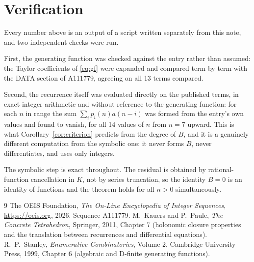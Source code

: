 \documentclass[11pt,a4paper]{article}
\theoremstyle{plain}
\theoremstyle{definition}
\begin{document}
\section{Verification}

Every number above is an output of a script written separately from this note, and two
independent checks were run.

First, the generating function was checked against the entry rather than assumed: the
Taylor coefficients of \eqref{eq:gf} were expanded and compared term by term with the DATA
section of A111779, agreeing on all 13 terms compared.

Second, the recurrence itself was evaluated directly on the published terms, in exact
integer arithmetic and without reference to the generating function: for each $n$ in range
the sum $\sum_{i}p_{i}(n)a(n-i)$ was formed from the entry's own values and found to
vanish, for all 14 values of $n$ from $n=7$ upward. This is what
Corollary~\ref{cor:criterion} predicts from the degree of $B$, and it is a genuinely
different computation from the symbolic one: it never forms $B$, never differentiates, and
uses only integers.

The symbolic step is exact throughout. The residual is obtained by rational-function
cancellation in $K$, not by series truncation, so the identity $B=0$ is an
identity of functions and the theorem holds for all $n>0$ simultaneously.

\begin{thebibliography}{9}
 The OEIS Foundation, \emph{The On-Line Encyclopedia of Integer Sequences},
\url{https://oeis.org}, 2026. Sequence A111779.
 M.~Kauers and P.~Paule, \emph{The Concrete Tetrahedron}, Springer, 2011,
Chapter 7 (holonomic closure properties and the translation between recurrences and
differential equations).
 R.~P.~Stanley, \emph{Enumerative Combinatorics}, Volume 2, Cambridge
University Press, 1999, Chapter 6 (algebraic and D-finite generating functions).
\end{thebibliography}
\end{document}
